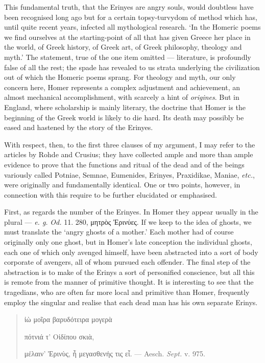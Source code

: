 \documentclass[a4paper, 11pt, oneside, polutonikogreek, english]{article}
\begin{document}
This fundamental truth, that the Erinyes are angry souls, would doubtless have been recognised long ago but for a certain topsy-turvydom of method which has, until quite recent years, infected all mythological research. `In the Homeric poems we find ourselves at the starting-point of all that has given Greece her place in the world, of Greek history, of Greek art, of Greek philosophy, theology and myth.' The statement, true of the one item omitted --- literature, is profoundly false of all the rest; the spade has revealed to us strata underlying the civilization out of which the Homeric poems sprang. For theology and myth, our only concern here, Homer represents a complex adjustment and achievement, an almost mechanical accomplishment, with scarcely a hint of \emph{origines}. But in England, where scholarship is mainly literary, the doctrine that Homer is the beginning of the Greek world is likely to die hard. Its death may possibly be eased and hastened by the story of the Erinyes.

With respect, then, to the first three clauses of my argument, I may refer to the articles by Rohde and Crusius; they have collected ample and more than ample evidence to prove that the functions and ritual of the dead and of the beings variously called Potniae, Semnae, Eumenides, Erinyes, Praxidikae, Maniae, \emph{etc.}, were originally and fundamentally identical. One or two points, however, in connection with this require to be further elucidated or emphasised.

First, as regards the number of the Erinyes. In Homer they appear usually in the plural --- \emph{e. g.} \emph{Od.} 11. 280, μητρὸς Ἐρινύες. If we keep to the idea of ghosts, we must translate the `angry ghosts of a mother.' Each mother had of course originally only one ghost, but in Homer's late conception the individual ghosts, each one of which only avenged himself, have been abstracted into a sort of body corporate of avengers, all of whom pursued each offender. The final step of the abstraction is to make of the Erinys a sort of personified conscience, but all this is remote from the manner of primitive thought. It is interesting to see that the tragedians, who are often far more local and primitive than Homer, frequently employ the singular and realise that each dead man has his own separate Erinys.
\begin{quotation}
\large
ἰὼ μοῖρα βαρυδότειρα μογερὰ

πότνιά τ' Οἰδίπου σκιὰ,

μέλαιν' Ἐρινὺς, ἦ μεγασθενής τις εἷ. --- Aesch. \emph{Sept.} v. 975.
\end{quotation}
\end{document}
